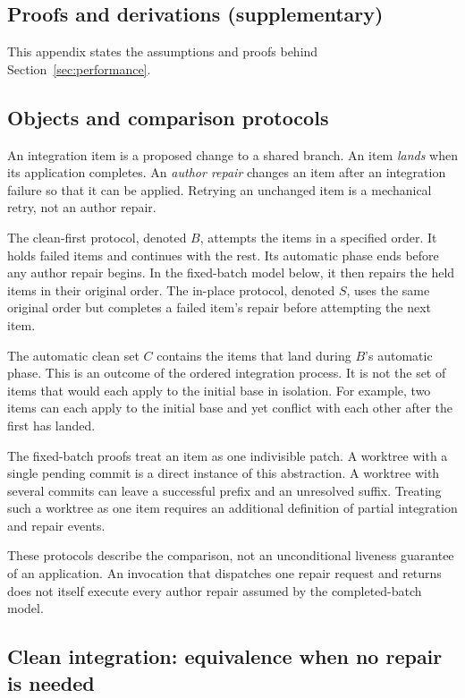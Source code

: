 \documentclass[pdflatex,sn-mathphys-ay]{sn-jnl}
\theoremstyle{thmstyleone}
\theoremstyle{thmstylethree}
\begin{document}
\begin{appendices}
\section{Proofs and derivations (supplementary)}\label{app:proofs}

This appendix states the assumptions and proofs behind Section~\ref{sec:performance}.

\subsection{Objects and comparison protocols}\label{app:objects}

An integration item is a proposed change to a shared branch. An item \emph{lands} when its application completes. An \emph{author repair} changes an item after an integration failure so that it can be applied. Retrying an unchanged item is a mechanical retry, not an author repair.

The clean-first protocol, denoted \(B\), attempts the items in a specified order. It holds failed items and continues with the rest. Its automatic phase ends before any author repair begins. In the fixed-batch model below, it then repairs the held items in their original order. The in-place protocol, denoted \(S\), uses the same original order but completes a failed item's repair before attempting the next item.

The automatic clean set \(C\) contains the items that land during \(B\)'s automatic phase. This is an outcome of the ordered integration process. It is not the set of items that would each apply to the initial base in isolation. For example, two items can each apply to the initial base and yet conflict with each other after the first has landed.

The fixed-batch proofs treat an item as one indivisible patch. A worktree with a single pending commit is a direct instance of this abstraction. A worktree with several commits can leave a successful prefix and an unresolved suffix. Treating such a worktree as one item requires an additional definition of partial integration and repair events.

These protocols describe the comparison, not an unconditional liveness guarantee of an application. An invocation that dispatches one repair request and returns does not itself execute every author repair assumed by the completed-batch model.

\subsection{Clean integration: equivalence when no repair is needed}\label{app:equivalence}


\end{appendices}
\end{document}
